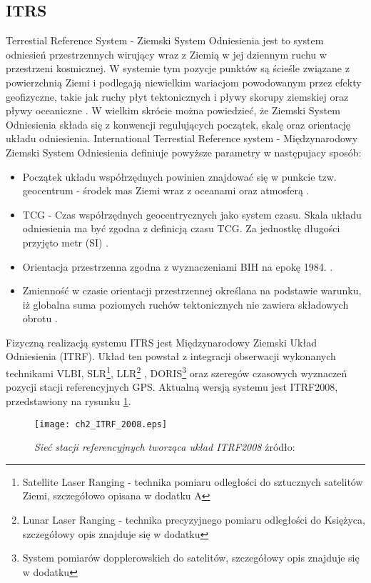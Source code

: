 	\subsection{ITRS}
Terrestial Reference System - Ziemski System Odniesienia jest to system odniesień przestrzennych wirujący wraz z Ziemią w jej dziennym ruchu w 
przestrzeni kosmicznej. W systemie tym pozycje punktów są ścieśle związane z powierzchnią Ziemi i podlegają niewielkim wariacjom powodowanym przez efekty geofizyczne, 
takie jak ruchy płyt tektonicznych i pływy skorupy ziemskiej oraz pływy oceaniczne \cite[][strona 34]{IERS_2010}.
W wielkim skrócie można powiedzieć, że Ziemski System Odniesienia składa się z konwencji regulujących początek, skalę oraz orientację układu odniesienia.
International Terrestial Reference system - Międzynarodowy Ziemski System Odniesienia definiuje powyższe parametry w następujacy sposób:
\begin{itemize}
\item Początek układu współrzędnych powinien znajdować się w punkcie tzw. geocentrum - środek mas Ziemi wraz z oceanami oraz atmosferą \cite[]{IERS_2010}.
\item TCG - Czas współrzędnych geocentrycznych jako system czasu. Skala układu odniesienia ma być zgodna z definicją czasu TCG. Za jednostkę 
długości przyjęto metr (SI) \cite[]{IERS_2010}.
\item Orientacja przestrzenna zgodna z wyznaczeniami BIH na epokę 1984. \cite[]{IERS_2010}.
\item Zmienność w czasie orientacji przestrzennej określana na podstawie warunku, iż globalna suma poziomych ruchów tektonicznych nie zawiera składowych 
obrotu \cite[]{IGIK_ITRS}.
\end{itemize}
Fizyczną realizacją systemu ITRS jest Międzynarodowy Ziemski Układ Odniesienia (ITRF). Układ ten powstał z integracji obserwacji wykonanych technikami VLBI, 
SLR\footnote{Satellite Laser Ranging - technika pomiaru odległości do sztucznych satelitów Ziemi, szczegółowo opisana w dodatku A}, LLR\footnote{
Lunar Laser Ranging - technika precyzyjnego pomiaru odległości do Księżyca, szczegółowy opis znajduje się w dodatku} , DORIS\footnote{System pomiarów dopplerowskich 
do satelitów, szczegółowy opis znajduje się w dodatku} oraz szeregów czasowych wyznaczeń pozycji stacji referencyjnych GPS. 
Aktualną wersją systemu jest ITRF2008, przedstawiony na rysunku \ref{fig:ch2_itrf_2008}. 
\begin{figure}[H]
\centering
\texttt{[image: ch2\_ITRF\_2008.eps]}
\caption{\textit{Sieć stacji referencyjnych tworząca układ ITRF2008} źródło: \cite[][strona 38]{IERS_2010}}
\label{fig:ch2_itrf_2008}
\end{figure}
